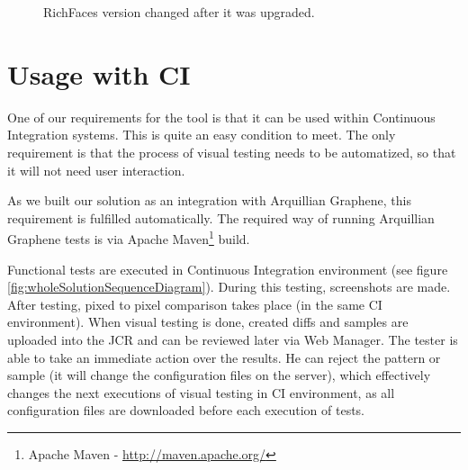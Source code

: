 \documentclass[11pt,oneside,final]{fithesis2}
\begin{document}
  \begin{figure}[!htb]
      \begin{center}
      \leavevmode
      \centerline{}
      \end{center}
      \caption{RichFaces version changed after it was upgraded.}
      \label{fig:rfVersionChanged}
  \end{figure}

  \section{Usage with CI}
  One of our requirements for the tool is that it can be used within Continuous Integration systems. This is quite an easy condition to meet.
  The only requirement is that the process of visual testing needs to be automatized, so that it will not need user interaction.
  
  As we built our solution as an integration with Arquillian Graphene, this requirement is fulfilled automatically. The required way of running
  Arquillian Graphene tests is via Apache Maven\footnote{Apache Maven - \url{http://maven.apache.org/}} build.
  
  Functional tests are executed in Continuous Integration environment (see figure \ref{fig:wholeSolutionSequenceDiagram}). During this testing,
  screenshots are made. After testing, pixed to pixel comparison takes place (in the same CI environment). When visual testing is done, created
  diffs and samples are uploaded into the JCR and can be reviewed later via Web Manager. The tester is able to take an immediate action
  over the results. He can reject the pattern or sample (it will change the configuration files on the server), which effectively changes the next executions of 
  visual testing in CI environment, as all configuration files are downloaded before each execution of tests.
  
\end{document}
